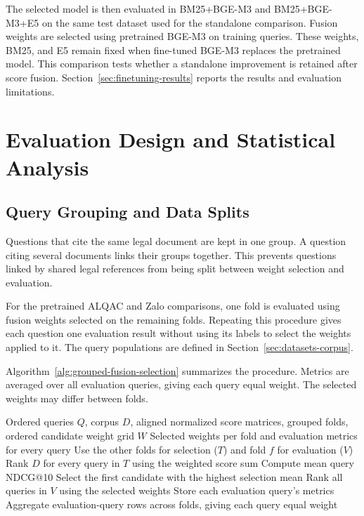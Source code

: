 The selected model is then evaluated in BM25+BGE-M3 and BM25+BGE-M3+E5 on the same test dataset used for the standalone comparison. Fusion weights are selected using pretrained BGE-M3 on training queries. These weights, BM25, and E5 remain fixed when fine-tuned BGE-M3 replaces the pretrained model. This comparison tests whether a standalone improvement is retained after score fusion. Section~\ref{sec:finetuning-results} reports the results and evaluation limitations.

\section{Evaluation Design and Statistical Analysis}
\label{sec:evaluation-design}

\subsection{Query Grouping and Data Splits}

Questions that cite the same legal document are kept in one group. A question citing several documents links their groups together. This prevents questions linked by shared legal references from being split between weight selection and evaluation.

For the pretrained ALQAC and Zalo comparisons, one fold is evaluated using fusion weights selected on the remaining folds. Repeating this procedure gives each question one evaluation result without using its labels to select the weights applied to it. The query populations are defined in Section~\ref{sec:datasets-corpus}.

Algorithm~\ref{alg:grouped-fusion-selection} summarizes the procedure. Metrics are averaged over all evaluation queries, giving each query equal weight. The selected weights may differ between folds.

\begin{algorithm}[H]
\caption{Grouped selection and evaluation of fusion weights}
\label{alg:grouped-fusion-selection}
\footnotesize
\begin{algorithmic}[1]
\Require Ordered queries $Q$, corpus $D$, aligned normalized score matrices, grouped folds, ordered candidate weight grid $W$
\Ensure Selected weights per fold and evaluation metrics for every query
    \State Use the other folds for selection ($T$) and fold $f$ for evaluation ($V$)
        \State Rank $D$ for every query in $T$ using the weighted score sum
        \State Compute mean query NDCG@10
    \EndFor
    \State Select the first candidate with the highest selection mean
    \State Rank all queries in $V$ using the selected weights
    \State Store each evaluation query's metrics
\EndFor
\State Aggregate evaluation-query rows across folds, giving each query equal weight
\end{algorithmic}
\end{algorithm}


